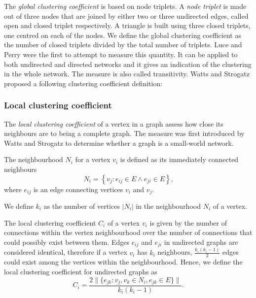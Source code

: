         The \emph{global clustering coefficient} is based on node triplets. A \emph{node triplet} is made out of three nodes that are joined by either two or three undirected edges, called open and closed triplet respectively. A triangle is built using three closed triplets, one centred on each of the nodes. We define the global clustering coefficient as the number of closed triplets divided by the total number of triplets. Luce and Perry were the first to attempt to measure this quantity\cite{LucePerry1949}. It can be applied to both undirected and directed networks and it gives an indication of the clustering in the whole network. The measure is also called transitivity\cite{WassermanFaust1994}. Watts and Strogatz proposed a following clustering coefficient definition: \cite{WattsStrogatz1998}

      \subsubsection{Local clustering coefficient}

        The \emph{local clustering coefficient} of a vertex in a graph assess how close its neighbours are to being a complete graph. The measure was first introduced by Watts and Strogatz to determine whether a graph is a small-world network\cite{WattsStrogatz1998}.

        The neighbourhood $N_i$ for a vertex $v_i$ is defined as its immediately connected neighbours
        \begin{equation}
          N_i = \left\{v_j: e_{ij} \in E \wedge e_{ji} \in E\right\} \mbox{,}
        \end{equation}
        where $e_{ij}$ is an edge connecting vertices $v_i$ and $v_j$.
        
        We define $k_i$ as the number of vertices $|N_i|$ in the neighbourhood $N_i$ of a vertex.

        The local clustering coefficient $C_i$ of a vertex $v_i$ is given by the number of connections within the vertex neighbourhood over the number of connections that could possibly exist between them. Edges $e_{ij}$ and $e_{ji}$ in undirected graphs are considered identical, therefore if a vertex $v_i$ has $k_i$ neighbours, $\frac{k_i(k_i-1)}{2}$ edges could exist among the vertices within the neighbourhood. Hence, we define the local clustering coefficient for undirected graphs as
        \begin{equation}
          C_i = \frac{2\|\{e_{jk}: v_j,v_k \in N_i, e_{jk} \in E\}\|}{k_i(k_i-1)} \mbox{.}
        \end{equation}

